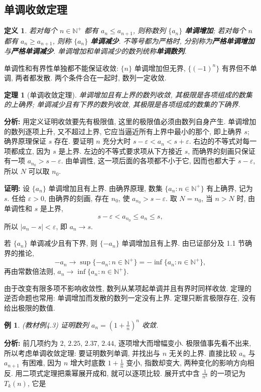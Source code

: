 \documentclass[UTF8,openany]{ctexbook}
\theoremstyle{chinesetextbook}
\newtheorem{definition}{定义}[section]
\newtheorem{example}{例}[section]
\newtheorem{theorem}{定理}[section]
\newenvironment{cnproof}{\par\indent\textbf{证明:} \ignorespaces}{\par}
\begin{document}
\subsection{单调收敛定理}
\begin{definition}
若对每个 $n\in\mathbb N^+$ 都有 $a_n\le a_{n+1}$, 则称数列 $\{a_n\}$ \textbf{单调增加}; 若对每个 $n$ 都有 $a_n\ge a_{n+1}$, 则称 $\{a_n\}$ \textbf{单调减少}. 不等号都为严格时, 分别称为\textbf{严格单调增加}与\textbf{严格单调减少}. 单调增加和单调减少的数列统称\textbf{单调数列}.
\end{definition}
单调性和有界性单独都不能保证收敛: $\{n\}$ 单调增加但无界, $\{(-1)^n\}$ 有界但不单调, 两者都发散. 两个条件合在一起时, 数列一定收敛.
\begin{theorem}[单调收敛定理]
单调增加且有上界的数列收敛, 其极限是各项组成的数集的上确界; 单调减少且有下界的数列收敛, 其极限是各项组成的数集的下确界.
\end{theorem}
\par\indent\textbf{分析:} 用定义证明收敛要先有极限值, 这里的极限值必须由数列自身产生. 单调增加的数列逐项上升, 又不超过上界, 它应当逼近所有上界中最小的那个, 即上确界 $s$; 确界原理保证 $s$ 存在. 要证明 $n$ 充分大时 $s-\varepsilon<a_n<s+\varepsilon$. 右边的不等式对每一项都成立, 因为 $s$ 是上界. 左边的不等式要求项从下方接近 $s$, 而确界的刻画只保证有一项 $a_{n_0}>s-\varepsilon$. 由单调性, 这一项后面的各项都不小于它, 因而也都大于 $s-\varepsilon$, 所以 $N$ 可以取 $n_0$.
\begin{cnproof}
设 $\{a_n\}$ 单调增加且有上界. 由确界原理, 数集 $\{a_n:n\in\mathbb N^+\}$ 有上确界, 记为 $s$. 任给 $\varepsilon>0$, 由确界的刻画, 存在 $n_0$, 使 $a_{n_0}>s-\varepsilon$. 取 $N=n_0$, 当 $n>N$ 时, 由单调性和 $s$ 是上界,
\[
s-\varepsilon<a_{n_0}\le a_n\le s,
\]
所以 $|a_n-s|<\varepsilon$, 即 $a_n\to s$.

若 $\{a_n\}$ 单调减少且有下界, 则 $\{-a_n\}$ 单调增加且有上界. 由已证部分及 1.1 节确界的推论,
\[
-a_n\to\sup\{-a_n:n\in\mathbb N^+\}=-\inf\{a_n:n\in\mathbb N^+\},
\]
再由常数倍法则, $a_n\to\inf\{a_n:n\in\mathbb N^+\}$.
\end{cnproof}
由于改变有限多项不影响收敛性, 数列从某项起单调并且有界时同样收敛. 定理的逆否命题也常用: 单调增加而发散的数列一定没有上界. 定理只断言极限存在, 没有给出极限的数值.
\begin{example}\label{ex:4-3}
\textnormal{(教材例4.3)} 证明数列 $\displaystyle a_n=\left(1+\frac1n\right)^n$ 收敛.
\end{example}
\par\indent\textbf{分析:} 前几项约为 $2$, $2.25$, $2.37$, $2.44$, 逐项增大而增幅变小. 极限值事先看不出来, 所以考虑单调收敛定理: 要证明数列单调, 并找出与 $n$ 无关的上界. 直接比较 $a_n$ 与 $a_{n+1}$ 有困难, 因为 $n$ 增大时底数 $\displaystyle1+\frac1n$ 变小, 指数却变大, 两种变化的影响方向相反. 用二项式定理把乘幂展开成和, 就可以逐项比较. 展开式中含 $\displaystyle\frac1{n^k}$ 的一项记为 $T_k(n)$, 它是
\end{document}
